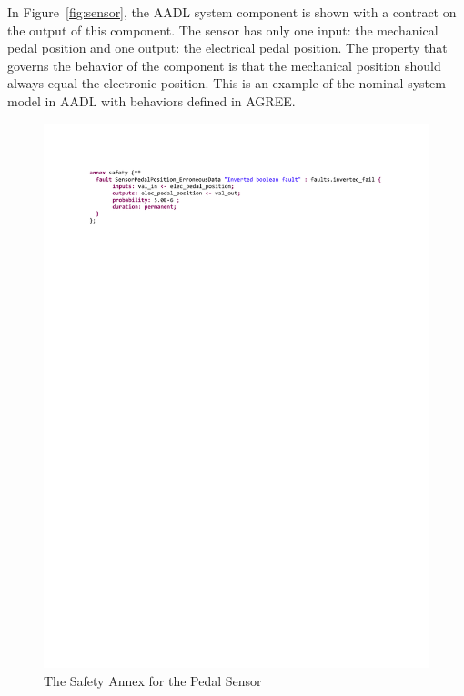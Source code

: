 In Figure~\ref{fig:sensor}, the AADL system component is shown with a contract on the output of this component. The sensor has only one input: the mechanical pedal position and one output: the electrical pedal position. The property that governs the behavior of the component is that the mechanical position should always equal the electronic position. This is an example of the nominal system model in AADL with behaviors defined in AGREE. 

\begin{figure}[h!]
	\hspace*{-2cm}
	\begin{center}
		\includegraphics[trim=0 690 -10 70,clip,width=1.5\dimexpr\textwidth-2cm\relax]{images/safetyannex_sensorfault.pdf}
		\caption{The Safety Annex for the Pedal Sensor}
		\label{fig:sensorFault}
	\end{center}
	\vspace{-0.3in}
\end{figure}

